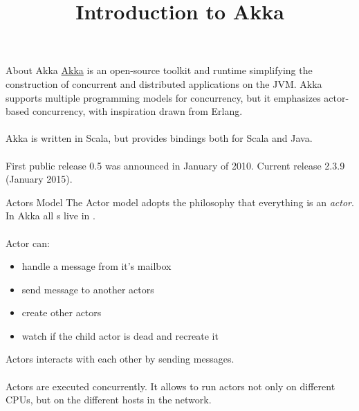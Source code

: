 

\title{Introduction to Akka}



\begin{frame}
    \titlepage
\end{frame}

\begin{frame}{About Akka}
\href{http://www.akka.io}{Akka} is an open-source toolkit and runtime simplifying the construction of concurrent
and distributed applications on the JVM. Akka supports multiple programming models
for concurrency, but it emphasizes actor-based concurrency, with inspiration drawn from Erlang.\\~\\

Akka is written in Scala, but provides bindings both for Scala and Java.\\~\\

First public release 0.5 was announced in January of 2010. Current release 2.3.9 (January 2015).
\end{frame}

\begin{frame}{Actors Model}
The Actor model adopts the philosophy that everything is an \emph{actor}.  In Akka all s
live in .\\~\\

Actor can:
\begin{itemize}
\item handle a message from it's mailbox
\item send message to another actors
\item create other actors
\item watch if the child actor is dead and recreate it
\end{itemize}
Actors interacts with each other  by sending messages.\\~\\

Actors are executed concurrently.  It allows to run actors not only on different CPUs, but on the
different hosts in the network.
\end{frame}

